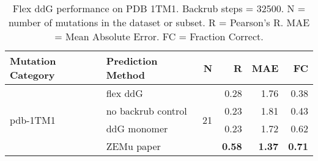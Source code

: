 \begin{table}
  \begin{tabular}{llrrrr}
\toprule
Mutation Category &   Prediction Method &   N &    R &  MAE &   FC \\
\midrule
 \multirow{ 4}{*}{pdb-1TM1} & flex ddG & \multirow{ 4}{*}{21} & 0.28 & 1.76 & 0.38  \\
 & no backrub control & & 0.23 & 1.81 & 0.43  \\
 & ddG monomer & & 0.23 & 1.72 & 0.62  \\
 & ZEMu paper & & \textbf{0.58} & \textbf{1.37} & \textbf{0.71}  \\
\bottomrule
\end{tabular}
  \caption[Flex ddG performance on PDB 1TM1]{
    Flex ddG performance on PDB 1TM1. Backrub steps = 32500. N = number of mutations in the dataset or subset. R = Pearson's R. MAE = Mean Absolute Error. FC = Fraction Correct.
  } \label{tab:table-pdb-1TM1}
\end{table}
